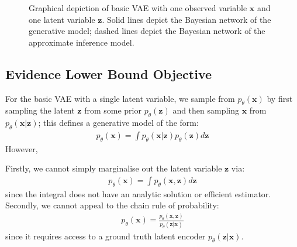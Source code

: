 \documentclass[ oneside,%
                    author={George Herbert},
                    degree={MSci},
                     title={Video Diffusion Models for Climate Simulations},
                  subtitle={}]{dissertation}
\begin{document}
\begin{figure}[htbp]
      \centering
      \caption{Graphical depiction of basic VAE with one observed variable $\mathbf{x}$ and one latent variable $\mathbf{z}$. Solid lines depict the Bayesian network of the generative model; dashed lines depict the Bayesian network of the approximate inference model.}
      \label{fig:vae}
\end{figure}

\subsection{Evidence Lower Bound Objective}
\label{sec:background_vae_elbo}

For the basic VAE with a single latent variable, we sample from $p_\theta(\mathbf{x})$ by first sampling the latent $\mathbf{z}$ from some prior $p_\theta(\mathbf{z})$ and then sampling $\mathbf{x}$ from $p_\theta(\mathbf{x}|\mathbf{z})$; this defines a generative model of the form:
\begin{align}
      p_\theta(\mathbf{x}) = \int p_\theta(\mathbf{x}|\mathbf{z})p_\theta(\mathbf{z}) d\mathbf{z}
\end{align}
However, 



Firstly, we cannot simply marginalise out the latent variable $\mathbf{z}$ via:
\begin{align}
      p_\theta(\mathbf{x})=\int p_\theta(\mathbf{x},\mathbf{z})d\mathbf{z}
\end{align}
since the integral does not have an analytic solution or efficient estimator. Secondly, we cannot appeal to the chain rule of probability:
\begin{align}
      p_\theta(\mathbf{x})=\frac{p_\theta(\mathbf{x},\mathbf{z})}{p_\theta(\mathbf{z}|\mathbf{x})}
\end{align}
since it requires access to a ground truth latent encoder $p_\theta(\mathbf{z}|\mathbf{x})$.
\end{document}
